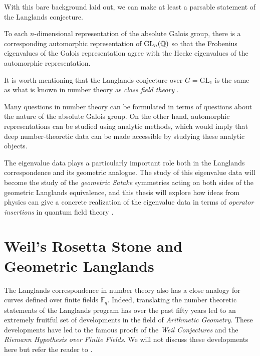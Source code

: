 With this bare background laid out, we can make at least a parsable statement of the Langlands conjecture.

\begin{conj}[Langlands]
	To each $n$-dimensional representation of the absolute Galois group, there is a corresponding automorphic representation of $\mathrm{GL}_n(\mathbb{Q})$ so that the Frobenius eigenvalues of the Galois representation agree with the Hecke eigenvalues of the automorphic representation.
\end{conj}

It is worth mentioning that the Langlands conjecture over $G = \mathrm{GL}_1$ is the same as what is known in number theory as \emph{class field theory} \cite{frenkel2007}. 


Many questions in number theory can be formulated in terms of questions about the nature of the absolute Galois group. On the other hand, automorphic representations can be studied using analytic methods, which would imply that deep number-theoretic data can be made accessible by studying these analytic objects.

The eigenvalue data plays a particularly important role both in the Langlands correspondence and its geometric analogue. The study of this eigenvalue data will become the study of the \emph{geometric Satake} symmetries acting on both sides of the geometric Langlands equivalence, and this thesis will explore how ideas from physics can give a concrete realization of the eigenvalue data in terms of \emph{operator insertions} in quantum field theory \cite{kapustin2006}. 


\section{Weil's Rosetta Stone and Geometric Langlands} %
\label{sec:weil_s_rosetta_stone_and_geometric_langlands}

The Langlands correspondence in number theory also has a close analogy for curves defined over finite fields $\mathbb F_q$. Indeed, translating the number theoretic statements of the Langlands program has over the past fifty years led to an extremely fruitful set of developments in the field of \emph{Arithmetic Geometry}. These developments have led to the famous proofs of the \emph{Weil Conjectures} and the \emph{Riemann Hypothesis over Finite Fields}. We will not discuss these developments here but refer the reader to \cite{osserman2008}. 

